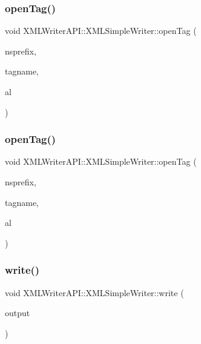\subsubsection{\texorpdfstring{openTag()}{openTag()}\hspace{0.1cm}{\footnotesize\ttfamily [11/12]}}
{\footnotesize\ttfamily void X\+M\+L\+Writer\+A\+P\+I\+::\+X\+M\+L\+Simple\+Writer\+::open\+Tag (\begin{DoxyParamCaption}\item[{const std\+::string \&}]{nsprefix,  }\item[{const std\+::string \&}]{tagname,  }\item[{\mbox{\hyperlink{namespaceXMLWriterAPI_a28cf3d8051a4ccf0aef208b7ebc66d07}{Attribute\+List}} \&}]{al }\end{DoxyParamCaption})}

\mbox{\label{classXMLWriterAPI_1_1XMLSimpleWriter_a4c32b9b8afe37e1ea1b0723d5248f140}} 
\subsubsection{\texorpdfstring{openTag()}{openTag()}\hspace{0.1cm}{\footnotesize\ttfamily [12/12]}}
{\footnotesize\ttfamily void X\+M\+L\+Writer\+A\+P\+I\+::\+X\+M\+L\+Simple\+Writer\+::open\+Tag (\begin{DoxyParamCaption}\item[{const std\+::string \&}]{nsprefix,  }\item[{const std\+::string \&}]{tagname,  }\item[{\mbox{\hyperlink{namespaceXMLWriterAPI_a28cf3d8051a4ccf0aef208b7ebc66d07}{Attribute\+List}} \&}]{al }\end{DoxyParamCaption})}

\mbox{\label{classXMLWriterAPI_1_1XMLSimpleWriter_a1c5de7aca63e28a5e02a3f054a2b2a75}} 
\subsubsection{\texorpdfstring{write()}{write()}\hspace{0.1cm}{\footnotesize\ttfamily [1/30]}}
{\footnotesize\ttfamily void X\+M\+L\+Writer\+A\+P\+I\+::\+X\+M\+L\+Simple\+Writer\+::write (\begin{DoxyParamCaption}\item[{const std\+::string \&}]{output }\end{DoxyParamCaption})}

